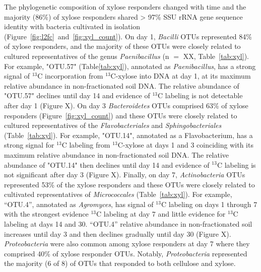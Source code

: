 The phylogenetic composition of xylose responders changed with time and the
majority (86\%) of xylose responders shared > 97\% SSU rRNA gene sequence
identity with bacteria cultivated in isolation
(Figure~\ref{fig:l2fc}~and~\ref{fig:xyl_count}). On day 1, \textit{Bacilli}
OTUs represented 84\% of xylose responders, and the majority of these OTUs were
closely related to cultured representatives of the genus \textit{Paenibacillus}
(n $=$ XX, Table~\ref{tab:xyl}). For example, "OTU.57" (Table\ref{tab:xyl}),
annotated as \textit{Paenibacillus}, has a strong signal of $^{13}$C
incorporation from $^{13}$C-xylose into DNA at day 1, at its maximum relative
abundance in non-fractionated soil DNA. The relative abundance of "OTU.57"
declines until day 14 and evidence of $^{13}$C labeling is not detectable after
day 1 (Figure X). On day 3 \textit{Bacteroidetes} OTUs comprised 63\% of xylose
responders (Figure~\ref{fig:xyl_count}) and these OTUs were closely related to
cultured representatives of the \textit{Flavobacteriales} and
\textit{Sphingobacteriales} (Table~\ref{tab:xyl}). For example, "OTU.14",
annotated as a Flavobacterium, has a strong signal for $^{13}$C labeling from
$^{13}$C-xylose at days 1 and 3 coinciding with its maximum relative abundance
in non-fractionated soil DNA. The relative abundance of "OTU.14" then declines
until day 14 and evidence of $^{13}$C  labeling is not significant after day
3 (Figure X). Finally, on day 7, \textit{Actinobacteria} OTUs represented 53\%
of the xylose responders and these OTUs were closely related to cultivated
representatives of \textit{Micrococcales} (Table~\ref{tab:xyl}). For example,
``OTU.4'', annotated as \textit{Agromyces}, has signal of $^{13}$C labeling on
days 1 through 7 with the strongest evidence $^{13}$C labeling at day 7 and
little evidence for $^{13}$C labeling at days 14 and 30. ``OTU.4'' relative
abundance in non-fractionated soil increases until day 3 and then declines
gradually until day 30 (Figure X). \textit{Proteobacteria} were also common
among xylose responders at day 7 where they comprised 40\% of xylose responder
OTUs. Notably, \textit{Proteobacteria} represented the majority (6 of 8) of
OTUs that responded to both cellulose and xylose. 

